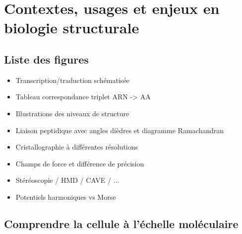 \chapter[Contextes, usages et enjeux en biologie structurale]{Contextes, usages et enjeux en biologie structurale}
\minitoc
\cleardoublepage




\section{Liste des figures}


\begin{itemize}
	\item Transcription/traduction schématisée
	\item Tableau correspondance triplet ARN -> AA
	\item Illustrations des niveaux de structure
	\item Liaison peptidique avec angles dièdres et diagramme Ramachandran
	\item Cristallographie à différentes résolutions
	\item Champs de force et différence de précision
	\item Stéréoscopie / HMD / CAVE / ...
	\item Potentiels harmoniques vs Morse
\end{itemize}

\section{Comprendre la cellule à l'échelle moléculaire}

